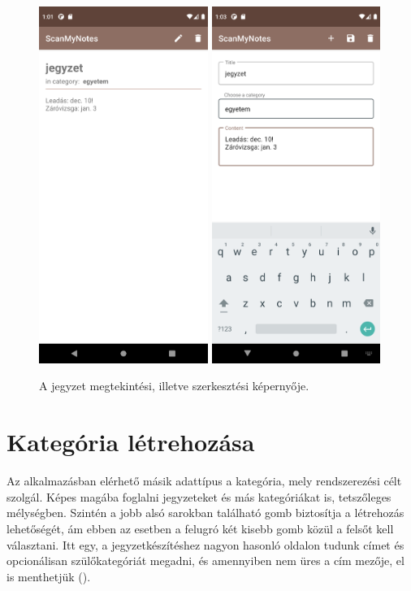 \begin{figure}[!ht]
	\centering
	\includegraphics[width=55mm, keepaspectratio]{figures/note_view.png}
	\includegraphics[width=55mm, keepaspectratio]{figures/note_edit.png}
	\caption{A jegyzet megtekintési, illetve szerkesztési képernyője.}
	\label{fig:NoteDetailsScreen}
\end{figure}
\newpage
\section{Kategória létrehozása}
Az alkalmazásban elérhető másik adattípus a kategória, mely rendszerezési célt szolgál. Képes magába foglalni jegyzeteket és más kategóriákat is, tetszőleges mélységben. Szintén a jobb alsó sarokban található gomb biztosítja a létrehozás lehetőségét, ám ebben az esetben a felugró két kisebb gomb közül a felsőt kell választani. Itt egy, a jegyzetkészítéshez nagyon hasonló oldalon tudunk címet és opcionálisan szülőkategóriát megadni, és amennyiben nem üres a cím mezője, el is menthetjük ().

